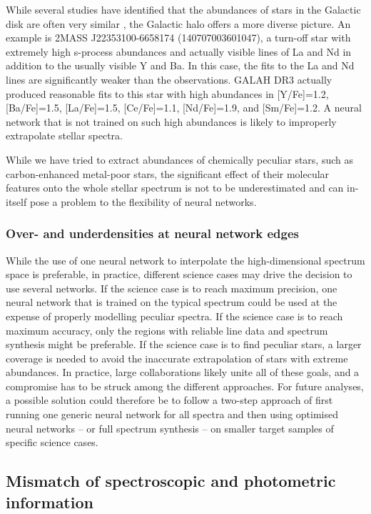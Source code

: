 \documentclass[
  journal=pasa,
  manuscript=research-paper, %
  year=2024,
  volume=37
]{cup-journal}
\begin{document}
While several studies have identified that the abundances of stars in the Galactic disk are often very similar \citep[e.g.][]{Ness2019b}, the Galactic halo offers a more diverse picture. An example is 2MASS J22353100-6658174 (140707003601047), a turn-off star with extremely high s-process abundances and actually visible lines of La and Nd in addition to the usually visible Y and Ba. In this case, the fits to the La and Nd lines are significantly weaker than the observations. GALAH DR3 actually produced reasonable fits to this star with high abundances in [Y/Fe]=1.2, [Ba/Fe]=1.5, [La/Fe]=1.5, [Ce/Fe]=1.1, [Nd/Fe]=1.9, and [Sm/Fe]=1.2. A neural network that is not trained on such high abundances is likely to improperly extrapolate stellar spectra.

While we have tried to extract abundances of chemically peculiar stars, such as carbon-enhanced metal-poor stars, the significant effect of their molecular features onto the whole stellar spectrum is not to be underestimated and can in-itself pose a problem to the flexibility of neural networks.

\subsubsection{Over- and underdensities at neural network edges}

While the use of one neural network to interpolate the high-dimensional spectrum space is preferable, in practice, different science cases may drive the decision to use several networks.
If the science case is to reach maximum precision, one neural network that is trained on the typical spectrum could be used at the expense of properly modelling peculiar spectra.
If the science case is to reach maximum accuracy, only the regions with reliable line data and spectrum synthesis might be preferable.
If the science case is to find peculiar stars, a larger coverage is needed to avoid the inaccurate extrapolation of stars with extreme abundances.
In practice, large collaborations likely unite all of these goals, and a compromise has to be struck among the different approaches.
For future analyses, a possible solution could therefore be to follow a two-step approach of first running one generic neural network for all spectra and then using optimised neural networks -- or full spectrum synthesis -- on smaller target samples of specific science cases.

\subsection{Mismatch of spectroscopic and photometric information} \label{sec:caveats_photospec}
\end{document}
